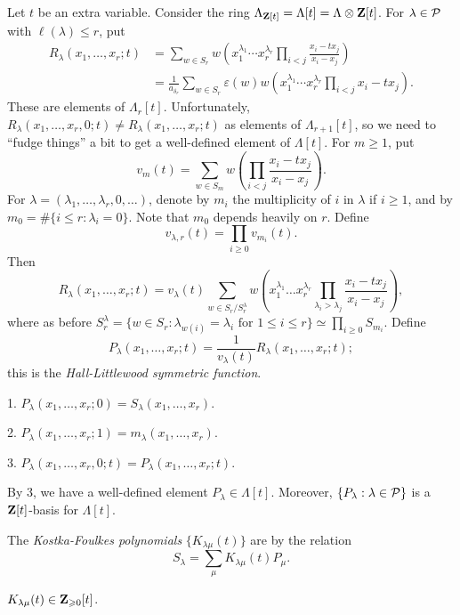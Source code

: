 \documentclass{article}
\begin{document}
Let $t$ be an extra variable. Consider the ring 
$\Lambda_{\mathbf{Z}[t]} = \Lambda[t] = \Lambda\otimes \mathbf{Z}[t]$. For $\lambda\in \mathcal{P}$ 
with $\ell(\lambda)\leqslant r$, put 
\begin{align*}
  R_\lambda(x_1,\dots,x_r;t) 
    &= \sum_{w\in S_r} w\left(x_1^{\lambda_1} \dotsm x_r^{\lambda_r} \prod_{i<j} \frac{x_i - t x_j}{x_i - x_j}\right) \\
    &= \frac{1}{a_{\delta_r}} \sum_{w\in S_r} \varepsilon(w) w\left(x_1^{\lambda_1} \dotsm x_r^{\lambda_r} \prod_{i<j} x_i - t x_j\right) .
\end{align*}
These are elements of $\Lambda_r[t]$. Unfortunately, 
$R_\lambda(x_1,\dots,x_r,0;t)\ne R_\lambda(x_1,\dots,x_r;t)$ as elements of 
$\Lambda_{r+1}[t]$, so we need to ``fudge things'' a bit to get a well-defined 
element of $\Lambda[t]$. For $m\geqslant 1$, put 
\[
  v_m(t) = \sum_{w\in S_m} w\left(\prod_{i<j} \frac{x_i-t x_j}{x_i - x_j}\right) .
\]
For $\lambda=(\lambda_1,\dots,\lambda_r,0,\dots)$, denote by $m_i$ the multiplicity 
of $i$ in $\lambda$ if $i\geqslant 1$, and by 
$m_0 = \#\{i\leqslant r:\lambda_i = 0\}$. Note that $m_0$ depends heavily on $r$. 
Define 
\[
  v_{\lambda,r}(t) = \prod_{i\geqslant 0} v_{m_i}(t) .
\]
Then 
\[
  R_\lambda(x_1,\dots,x_r;t) = v_\lambda(t) \sum_{w\in S_r/S_r^\lambda} w\left(x_1^{\lambda_1} \dots x_r^{\lambda_r} \prod_{\lambda_i>\lambda_j} \frac{x_i-t x_j}{x_i-x_j}\right) ,
\]
where as before 
$S_r^\lambda = \{w\in S_r:\lambda_{w(i)} = \lambda_i\text{ for }1\leqslant i\leqslant r\} \simeq \prod_{i\geqslant 0} S_{m_i}$. Define 
\[
  P_\lambda(x_1,\dots,x_r;t) = \frac{1}{v_\lambda(t)} R_\lambda(x_1,\dots,x_r;t) ; 
\]
this is the \emph{Hall-Littlewood symmetric function}. 

\begin{proposition}
1. $P_\lambda(x_1,\dots,x_r;0) = S_\lambda(x_1,\dots,x_r)$. 

2. $P_\lambda(x_1,\dots,x_r;1) = m_\lambda(x_1,\dots,x_r)$. 

3. $P_\lambda(x_1,\dots,x_r,0;t) = P_\lambda(x_1,\dots,x_r;t)$. 
\end{proposition}

By 3, we have a well-defined element $P_\lambda\in \Lambda[t]$. Moreover, 
$\{P_\lambda:\lambda\in \mathcal{P}\}$ is a $\mathbf{Z}[t]$-basis for $\Lambda[t]$. 

The \emph{Kostka-Foulkes polynomials} $\{K_{\lambda\mu}(t)\}$ are by 
the relation 
\[
  S_\lambda = \sum_\mu K_{\lambda\mu}(t) P_\mu .
\]

\begin{theorem}
$K_{\lambda\mu}(t)\in \mathbf{Z}_{\geqslant 0}[t]$. 
\end{theorem}
\end{document}
